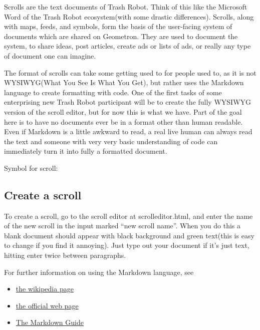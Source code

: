 

Scrolls are the text documents of Trash Robot. Think of this like the
Microsoft Word of the Trash Robot ecosystem(with some drastic
differences). Scrolls, along with maps,
feeds, and symbols, form the basis of the user-facing system of documents which are shared
on Geometron. They are used to document the system, to share ideas, post
articles, create ads or lists of ads, or really any type of document one
can imagine.

The format of scrolls can take some getting used to for people used to,
as it is not WYSIWYG(What You See Is What You Get), but rather uses the
Markdown language to create formatting with code. One of the first tasks
of some enterprising new Trash Robot participant will be to create the
fully WYSIWYG version of the scroll editor, but for now this is what we
have. Part of the goal here is to have no documents ever be in a format
other than human readable. Even if Markdown is a little awkward to read,
a real live human can always read the text and someone with very very
basic understanding of code can immediately turn it into fully a
formatted document.

Symbol for scroll:


\subsection{Create a scroll}\label{create-a-scroll}

To create a scroll, go to the scroll editor at scrolleditor.html,
and enter the name of the new scroll in the input marked ``new scroll
name''. When you do this a blank document should appear with black
background and green text(this is easy to change if you find it
annoying). Just type out your document if it's just text, hitting enter
twice between paragraphs.

For further information on using the Markdown language, see

\begin{itemize}
\tightlist
\item
  \href{https://en.wikipedia.org/wiki/Markdown}{the wikipedia page}
\item
  \href{https://daringfireball.net/projects/markdown/}{the official web
  page}
\item
  \href{https://www.markdownguide.org/}{The Markdown Guide}
\end{itemize}

